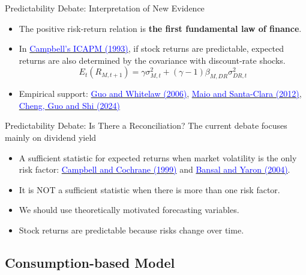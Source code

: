 \documentclass{beamer}
\begin{document}
\begin{frame}{Predictability Debate: Interpretation of New Evidence}
	\begin{itemize}
		\item The positive risk-return relation is \textbf{the first fundamental law of finance}.
		\item In \href{http://www.jstor.org/stable/2117530}{\textcolor{blue}{Campbell's ICAPM (1993)}}, if stock returns are predictable, expected returns are also determined by the covariance with discount-rate shocks.
        \begin{equation*}
            E_{t}\left(R_{M, t+1}\right)=\gamma \sigma_{M, t}^{2}+(\gamma-1) \beta_{M, D R} \sigma_{D R, t}^{2}
        \end{equation*}
		\item Empirical support: \href{https://doi.org/10.1111/j.1540-6261.2006.00877.x}{\textcolor{blue}{Guo and Whitelaw (2006)}}, \href{https://doi.org/10.1016/j.jfineco.2012.07.001}{\textcolor{blue}{Maio and Santa-Clara (2012)}}, \href{https://www.sciencedirect.com/science/article/pii/S0378426624000372}{\textcolor{blue}{Cheng, Guo and Shi (2024)}}
	\end{itemize}
\end{frame} 


\begin{frame}{Predictability Debate: Is There a Reconciliation?}
	The current debate focuses mainly on dividend yield
	\begin{itemize}
		\item A sufficient statistic for expected returns when market volatility is the only
		risk factor: \href{https://doi.org/10.1086/250059}{\textcolor{blue}{Campbell and Cochrane (1999)}} and \href{https://doi.org/10.1111/j.1540-6261.2004.00670.x}{\textcolor{blue}{Bansal and Yaron (2004)}}.
		\item It is NOT a sufficient statistic when there is more than one risk factor.
		\item We should use theoretically motivated forecasting variables.
		\item Stock returns are predictable because risks change over time.
	\end{itemize}
\end{frame}


\subsection{Consumption-based Model}
\end{document}
